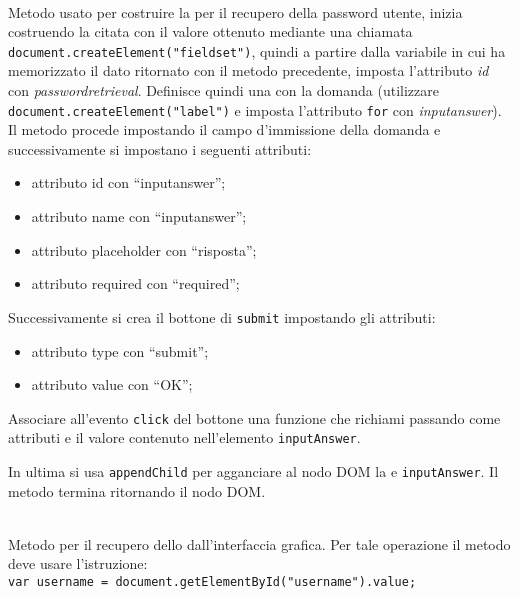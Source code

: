 \begin{description}
	\item{}\\
	Metodo usato per costruire la  per il recupero della password utente, inizia costruendo la citata  con il valore ottenuto mediante una chiamata \verb|document.createElement("fieldset")|, quindi a partire dalla variabile in cui ha memorizzato il dato ritornato con il metodo precedente, imposta l'attributo \textit{id} con \textit{passwordretrieval}. Definisce quindi una  con la domanda (utilizzare \verb|document.createElement("label")| e imposta l'attributo \texttt{for} con \textit{inputanswer}). Il metodo procede impostando il campo d'immissione della domanda e successivamente si impostano i seguenti attributi:
	\begin{itemize}
		\item attributo id con ``inputanswer'';
		\item attributo name con ``inputanswer'';
		\item attributo placeholder con ``risposta'';
		\item attributo required con ``required'';
	\end{itemize}
	
	Successivamente si crea il bottone di \texttt{submit} impostando gli attributi:
	\begin{itemize}
		\item attributo type con ``submit'';
		\item attributo value con ``OK'';
	\end{itemize}
	
	Associare all'evento \texttt{click} del bottone una funzione che richiami  passando come attributi  e il valore contenuto nell'elemento \texttt{inputAnswer}.
	
	In ultima si usa \texttt{appendChild} per agganciare al nodo DOM la  e \texttt{inputAnswer}. Il metodo termina ritornando il nodo DOM.
	
	\item{}\\
	Metodo  per il recupero dello  dall'interfaccia grafica. Per tale operazione il metodo deve usare l'istruzione:\\
	
	\verb|var username = document.getElementById("username").value;|
	\\
	

\end{description}
